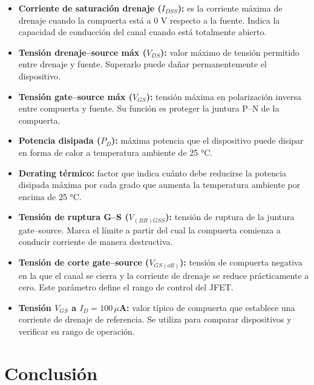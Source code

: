 \documentclass[chaptersright]{informeutn}
\begin{document}
\begin{itemize}
  \item \textbf{Corriente de saturación drenaje ($I_{DSS}$):} es la corriente máxima de drenaje cuando la compuerta está a 0 V respecto a la fuente. Indica la capacidad de conducción del canal cuando está totalmente abierto.
  
  \item \textbf{Tensión drenaje–source máx ($V_{DS}$):} valor máximo de tensión permitido entre drenaje y fuente. Superarlo puede dañar permanentemente el dispositivo.
  
  \item \textbf{Tensión gate–source máx ($V_{GS}$):} tensión máxima en polarización inversa entre compuerta y fuente. Su función es proteger la juntura P–N de la compuerta.
  
  \item \textbf{Potencia disipada ($P_{D}$):} máxima potencia que el dispositivo puede disipar en forma de calor a temperatura ambiente de 25 °C.
  
  \item \textbf{Derating térmico:} factor que indica cuánto debe reducirse la potencia disipada máxima por cada grado que aumenta la temperatura ambiente por encima de 25 °C.
  
  \item \textbf{Tensión de ruptura G–S ($V_{(BR)GSS}$):} tensión de ruptura de la juntura gate–source. Marca el límite a partir del cual la compuerta comienza a conducir corriente de manera destructiva.
  
  \item \textbf{Tensión de corte gate–source ($V_{GS(\text{off})}$):} tensión de compuerta negativa en la que el canal se cierra y la corriente de drenaje se reduce prácticamente a cero. Este parámetro define el rango de control del JFET.
  
  \item \textbf{Tensión $V_{GS}$ a $I_D=100\,\mu$A:} valor típico de compuerta que establece una corriente de drenaje de referencia. Se utiliza para comparar dispositivos y verificar su rango de operación.
\end{itemize}

\noindent



\chapter{Conclusión}
\end{document}
